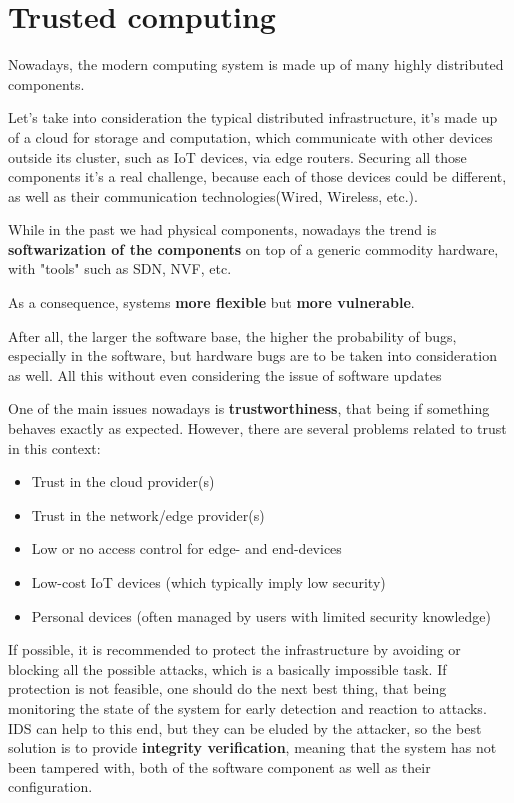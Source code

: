 \chapter{Trusted computing}
Nowadays, the modern computing system is made up of many highly
distributed components.

Let's take into consideration the typical distributed infrastructure,
it's made up of a cloud for storage and computation, which communicate
with other devices outside its cluster, such as IoT devices, via edge
routers. Securing all those components it's a real challenge, because
each of those devices could be different, as well as their
communication technologies(Wired, Wireless, etc.). 

While in the past we had physical components, nowadays the trend is
\textbf{softwarization of the components} on top of a generic
commodity hardware, with "tools" such as SDN, NVF, etc.
\begin{boxH}
  As a consequence, systems \textbf{more flexible} but \textbf{more
  vulnerable}.
\end{boxH}
After all, the larger the software base, the higher the probability of
bugs, especially in the software, but hardware bugs are to be taken 
into consideration as well. All this without even considering the
issue of software updates

One of the main issues nowadays is \textbf{trustworthiness}, that being if
something behaves exactly as expected. However, there are several problems
related to trust in this context:

\begin{itemize}
    \item Trust in the cloud provider(s)
    \item Trust in the network/edge provider(s)
    \item Low or no access control for edge- and end-devices
    \item Low-cost IoT devices (which typically imply low security)
    \item Personal devices (often managed by users with limited 
          security knowledge)
\end{itemize}

If possible, it is recommended to protect the infrastructure by
avoiding or blocking all the possible attacks, which is a basically
impossible task. If protection is not feasible, one should do the next
best thing, that being monitoring the state of the system for early
detection and reaction to attacks. IDS can help to this end, but they
can be eluded by the attacker, so the best solution is to provide 
\textbf{integrity verification}, meaning that the system has not been
tampered with, both of the software component as well as their
configuration.

